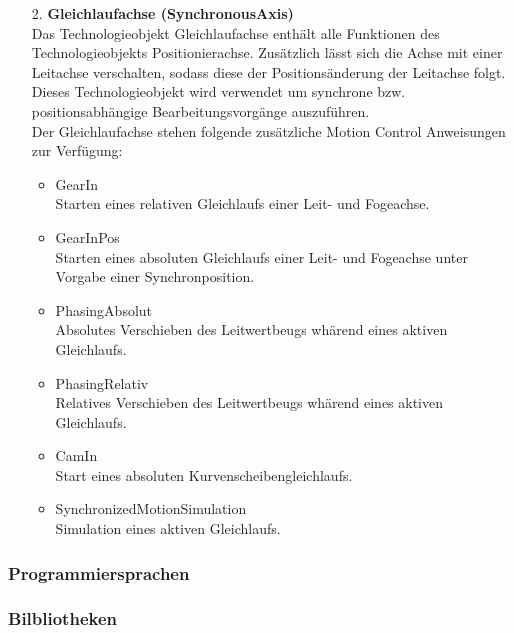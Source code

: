 \begin{itemize}
        \item[2.] \textbf{Gleichlaufachse (SynchronousAxis)} \\
            Das Technologieobjekt Gleichlaufachse enthält alle Funktionen des Technologieobjekts Positionierachse. Zusätzlich lässt sich die Achse mit einer Leitachse verschalten, sodass diese der Positionsänderung der Leitachse folgt. Dieses Technologieobjekt wird verwendet um synchrone bzw. positionsabhängige Bearbeitungsvorgänge auszuführen. \\
            Der Gleichlaufachse stehen folgende zusätzliche Motion Control Anweisungen zur Verfügung:
            \begin{itemize}
                \item GearIn \\
                    Starten eines relativen Gleichlaufs einer Leit- und Fogeachse.
                \item GearInPos \\
                    Starten eines absoluten Gleichlaufs einer Leit- und Fogeachse unter Vorgabe einer Synchronposition.
                \item PhasingAbsolut \\
                    Absolutes Verschieben des Leitwertbeugs whärend eines aktiven Gleichlaufs.
                \item PhasingRelativ \\
                    Relatives Verschieben des Leitwertbeugs whärend eines aktiven Gleichlaufs.
                \item CamIn \\
                    Start eines absoluten Kurvenscheibengleichlaufs.
                \item SynchronizedMotionSimulation \\
                    Simulation eines aktiven Gleichlaufs. 
                    \cite{Technologieobjekte}
            \end{itemize}
             
    \end{itemize}

    \subsubsection{Programmiersprachen}


    \subsubsection{Bilbliotheken}
    \label{Bibliotheken}


